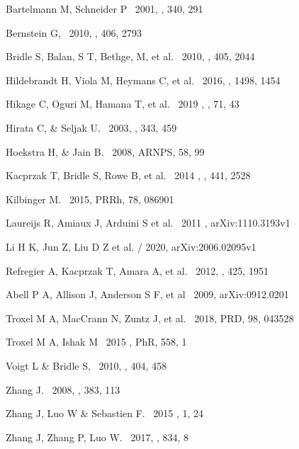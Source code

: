 \documentclass[twocolumn]{aastex62}
\begin{document}
\begin{thebibliography}{}
Bartelmann M, Schneider P \ 2001, \physrep, 340, 291

Bernstein G, \ 2010, \mnras, 406, 2793 

Bridle S, Balan, S T, Bethge, M, et al. \ 2010, \mnras, 405, 2044

Hildebrandt H, Viola M, Heymans C, et al. \ 2016, \mnras, 1498, 1454

Hikage C, Oguri M, Hamana T, et al. \ 2019 , \pasj, 71, 43

Hirata C, \& Seljak U. \ 2003,  \mnras,  343, 459

Hoekstra H, \& Jain B. \ 2008, ARNPS, 58, 99

Kacprzak T, Bridle S, Rowe B, et al. \ 2014 , \mnras, 441, 2528

Kilbinger M. \ 2015,  PRRh, 78, 086901

Laureijs R, Amiaux J, Arduini S et al. \ 2011 , arXiv:1110.3193v1

Li H K, Jun Z, Liu D Z et al. / 2020,  arXiv:2006.02095v1

Refregier A, Kacprzak T, Amara A, et al.  \ 2012, \mnras, 425, 1951

Abell P A, Allison J, Anderson S F, et al \ 2009, arXiv:0912.0201 

Troxel M A, MacCrann N, Zuntz J, et al. \ 2018, PRD, 98, 043528

Troxel M A, Ishak M  \ 2015 , PhR, 558, 1

Voigt L \& Bridle S, \ 2010, \mnras, 404, 458

 Zhang J. \ 2008, \mnras, 383, 113

 Zhang J, Luo W \& Sebastien F. \ 2015 \jcap, 1, 24

 Zhang J, Zhang P, Luo W. \ 2017, \apj, 834, 8
	
\end{thebibliography}
\end{document}
